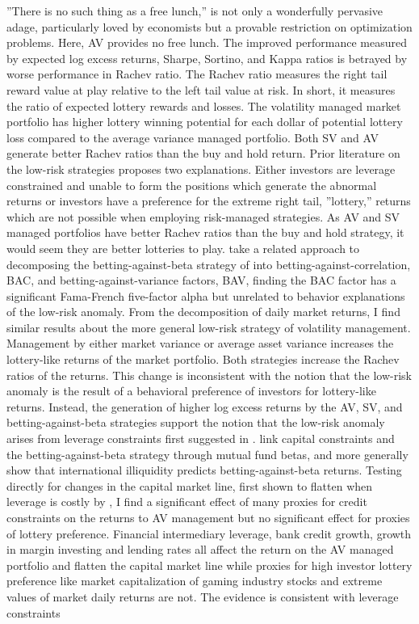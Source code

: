 ”There is no such thing as a free lunch,” is not only a wonderfully pervasive adage, particularly loved by economists but a provable restriction on optimization problems. \citep{wolpert_no_1997} Here, AV provides no free lunch. The improved performance measured by expected log excess returns, Sharpe, Sortino, and Kappa ratios is betrayed by worse performance in Rachev ratio. The Rachev ratio measures the right tail reward value at play relative to the left tail value at risk. In short, it measures the ratio of expected lottery rewards and losses. The volatility managed market portfolio has higher lottery winning potential for each dollar of potential lottery loss compared to the average variance managed portfolio. Both SV and AV generate better Rachev ratios than the buy and hold return. Prior literature on the low-risk strategies proposes two explanations. Either investors are leverage constrained and unable to form the positions which generate the abnormal returns or investors have a preference for the extreme right tail, ”lottery,” returns which are not possible when employing risk-managed strategies. As AV and SV managed portfolios have better Rachev ratios than the buy and hold strategy, it would seem they are better lotteries to play. \citet{asness_betting_2018} take a related approach to decomposing the betting-against-beta strategy of \citet{frazzini_betting_2014} into betting-against-correlation, BAC, and betting-against-variance factors, BAV, finding the BAC factor has a significant Fama-French five-factor alpha but unrelated to behavior explanations of the low-risk anomaly. \citep{fama_dissecting_2016} From the decomposition of daily market returns, I find similar results about the more general low-risk strategy of volatility management. Management by either market variance or average asset variance increases the lottery-like returns of the market portfolio. Both strategies increase the Rachev ratios of the returns. This change is inconsistent with the notion that the low-risk anomaly is the result of a behavioral preference of investors for lottery-like returns. \citep{barberis_stocks_2008,brunnermeier_optimal_2007} Instead, the generation of higher log excess returns by the AV, SV, and betting-against-beta strategies support the notion that the low-risk anomaly arises from leverage constraints first suggested in \citet{black1972capital}. \citet{boguth_leverage_2018} link capital constraints and the betting-against-beta strategy through mutual fund betas, and more generally \citet{malkhozov_international_2017} show that international illiquidity predicts betting-against-beta returns. Testing directly for changes in the capital market line, first shown to flatten when leverage is costly by \citet{jylha_margin_2018}, I find a significant effect of many proxies for credit constraints on the returns to AV management but no significant effect for proxies of lottery preference. Financial intermediary leverage, bank credit growth, growth in margin investing and lending rates all affect the return on the AV managed portfolio and flatten the capital market line while proxies for high investor lottery preference like market capitalization of gaming industry stocks and extreme values of market daily returns are not. The evidence is consistent with leverage constraints 